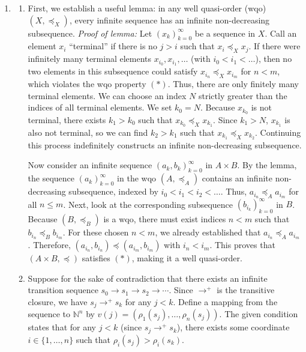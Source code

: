 \documentclass{article}
\begin{document}
\begin{enumerate}[label=\fbox{\arabic*}]
  \item %
        \begin{enumerate}[label=(\arabic*)]
          \item First, we establish a useful lemma: in any well quasi-order (wqo) $(X, \preceq_X)$, every infinite sequence has an infinite non-decreasing subsequence. 
          \textit{Proof of lemma:} Let $(x_k)_{k=0}^\infty$ be a sequence in $X$. Call an element $x_i$ ``terminal'' if there is no $j > i$ such that $x_i \preceq_X x_j$. If there were infinitely many terminal elements $x_{i_0}, x_{i_1}, \dots$ (with $i_0 < i_1 < \dots$), then no two elements in this subsequence could satisfy $x_{i_n} \preceq_X x_{i_m}$ for $n < m$, which violates the wqo property $(*)$. Thus, there are only finitely many terminal elements. We can choose an index $N$ strictly greater than the indices of all terminal elements. We set $k_0 = N$. Because $x_{k_0}$ is not terminal, there exists $k_1 > k_0$ such that $x_{k_0} \preceq_X x_{k_1}$. Since $k_1 > N$, $x_{k_1}$ is also not terminal, so we can find $k_2 > k_1$ such that $x_{k_1} \preceq_X x_{k_2}$. Continuing this process indefinitely constructs an infinite non-decreasing subsequence.

          Now consider an infinite sequence $(a_k, b_k)_{k=0}^\infty$ in $A \times B$. By the lemma, the sequence $(a_k)_{k=0}^\infty$ in the wqo $(A, \preceq_A)$ contains an infinite non-decreasing subsequence, indexed by $i_0 < i_1 < i_2 < \dots$. Thus, $a_{i_n} \preceq_A a_{i_m}$ for all $n \le m$.
          Next, look at the corresponding subsequence $(b_{i_k})_{k=0}^\infty$ in $B$. Because $(B, \preceq_B)$ is a wqo, there must exist indices $n < m$ such that $b_{i_n} \preceq_B b_{i_m}$.
          For these chosen $n < m$, we already established that $a_{i_n} \preceq_A a_{i_m}$. 
          Therefore, $(a_{i_n}, b_{i_n}) \preceq (a_{i_m}, b_{i_m})$ with $i_n < i_m$. This proves that $(A \times B, \preceq)$ satisfies $(*)$, making it a well quasi-order.

          \item Suppose for the sake of contradiction that there exists an infinite transition sequence $s_0 \to s_1 \to s_2 \to \cdots$.
          Since $\to^+$ is the transitive closure, we have $s_j \to^+ s_k$ for any $j < k$.
          Define a mapping from the sequence to $\mathbb{N}^n$ by $v(j) = (\rho_1(s_j), \dots, \rho_n(s_j))$.
          The given condition states that for any $j < k$ (since $s_j \to^+ s_k$), there exists some coordinate $i \in \{1, \dots, n\}$ such that $\rho_i(s_j) > \rho_i(s_k)$.
          

\end{enumerate}
\end{enumerate}
\end{document}
